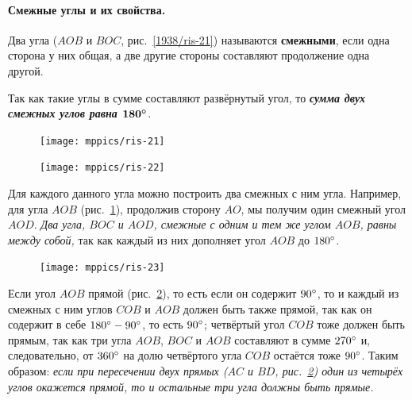 \documentclass[twoside]{book}
\makeatletter
\newcommand{\rindex}[2][\imki@jobname]{%
  \index[#1]{\detokenize{#2}}%
}
\makeatother
\begin{document}
\paragraph{Смежные углы и их свойства.}\label{1938/22}
Два угла ($AOB$ и $BOC$, рис.~\ref{1938/ris-21}) называются \rindex{смежные углы}\textbf{смежными}, если одна сторона у них общая, а две другие стороны составляют продолжение одна другой.

Так как такие углы в сумме составляют развёрнутый угол, то \textbf{\emph{сумма двух смежных углов равна $\bm{180\degree}$}}.

\begin{figure}[h!]
\begin{minipage}{.48\textwidth}
\centering
\texttt{[image: mppics/ris-21]}
\end{minipage}\hfill
\begin{minipage}{.48\textwidth}
\centering
\texttt{[image: mppics/ris-22]}
\end{minipage}

\medskip

\begin{minipage}{.48\textwidth}
\centering
\caption{}\label{1938/ris-21}
\end{minipage}\hfill
\begin{minipage}{.48\textwidth}
\centering
\caption{}\label{1938/ris-22}
\end{minipage}
\vskip-4mm
\end{figure}

Для каждого данного угла можно построить два смежных с ним угла.
Например, для угла $AOB$ (рис.~\ref{1938/ris-22}), продолжив сторону $AO$, мы получим один смежный угол $AOD$.
\emph{Два угла, $BOC$ и $AOD$, смежные с одним и тем же углом $AOB$, равны между собой,} так как каждый из них дополняет угол $AOB$ до $180\degree$.

\begin{figure}
\centering
\texttt{[image: mppics/ris-23]}
\caption{}\label{1938/ris-23}
\end{figure}

Если угол $AOB$ прямой (рис.~\ref{1938/ris-23}), то есть если он содержит $90\degree$, то и каждый из смежных с ним углов $COB$ и $AOB$ должен быть также прямой, так как он содержит в себе $180\degree-90\degree$, то есть $90\degree$;
четвёртый угол $COB$ тоже должен быть прямым, так как три угла $AOB$, $BOC$ и $AOB$ составляют в сумме $270\degree$ и, следовательно, от $360\degree$ на долю четвёртого угла $COB$ остаётся тоже $90\degree$.
Таким образом:
\emph{если при пересечении двух прямых \emph{($AC$ и $BD$, рис.~\ref{1938/ris-23})} один из четырёх углов окажется прямой, то и остальные три угла должны быть прямые.}
\end{document}
